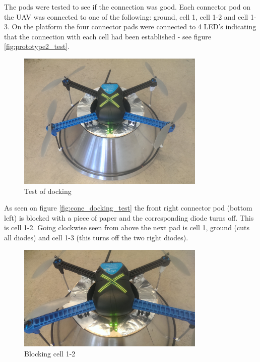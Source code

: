 The pods were tested to see if the connection was good. Each connector pod on the UAV was connected to one of the following: ground, cell 1, cell 1-2 and cell 1-3. On the platform the four connector pads were connected to 4 LED's indicating that the connection with each cell had been established - see figure \vref{fig:prototype2_test}.

\begin{figure}
	\centering
	\includegraphics[width=0.8\textwidth]{imgs/prototype2_test}
	\caption{Test of docking}
	\label{fig:prototype2_test}
\end{figure}

As seen on figure \vref{fig:cone_docking_test} the front right connector pod (bottom left) is blocked with a piece of paper and the corresponding diode turns off. This is cell 1-2. Going clockwise seen from above the next pad is cell 1, ground (cuts all diodes) and cell 1-3 (this turns off the two right diodes).

\begin{figure}
	\centering
	\includegraphics[width=0.8\textwidth]{imgs/cone_blocking_cell_1-2}
	\caption{Blocking cell 1-2}
	\label{fig:cone_docking_test}
\end{figure}

